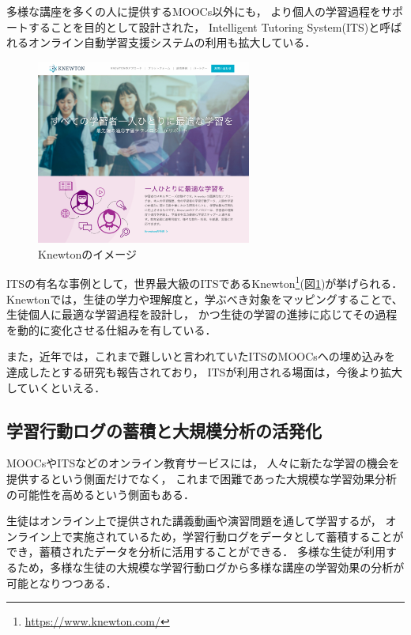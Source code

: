 多様な講座を多くの人に提供するMOOCs以外にも，
より個人の学習過程をサポートすることを目的として設計された，
Intelligent Tutoring System(ITS)と呼ばれるオンライン自動学習支援システムの利用も拡大している\cite{sleeman1982intelligent}．

\begin{figure}[htb]
\begin{center}
\includegraphics[width=200pt]{./img/knewton.pdf}
\end{center}
\caption{Knewtonのイメージ}
\label{fig:knewton}
\end{figure}

ITSの有名な事例として，世界最大級のITSであるKnewton\footnote{\url{https://www.knewton.com/}}(図\ref{fig:knewton})が挙げられる．
Knewtonでは，生徒の学力や理解度と，学ぶべき対象をマッピングすることで、
生徒個人に最適な学習過程を設計し，
かつ生徒の学習の進捗に応じてその過程を動的に変化させる仕組みを有している\cite{upbin2012knewton}．


また，近年では，これまで難しいと言われていたITSのMOOCsへの埋め込みを達成したとする研究\cite{aleven2015beginning}も報告されており，
ITSが利用される場面は，今後より拡大していくといえる．



\subsection{学習行動ログの蓄積と大規模分析の活発化}

MOOCsやITSなどのオンライン教育サービスには，
人々に新たな学習の機会を提供するという側面だけでなく，
これまで困難であった大規模な学習効果分析の可能性を高めるという側面もある．

生徒はオンライン上で提供された講義動画や演習問題を通して学習するが，
オンライン上で実施されているため，学習行動ログをデータとして蓄積することができ，蓄積されたデータを分析に活用することができる．
多様な生徒が利用するため，多様な生徒の大規模な学習行動ログから多様な講座の学習効果の分析が可能となりつつある．

